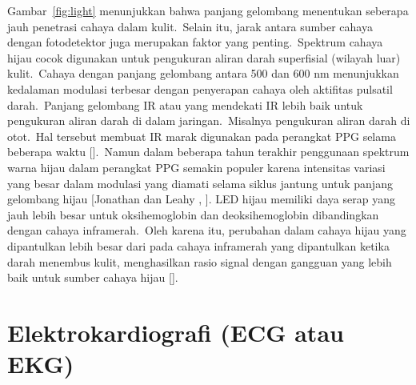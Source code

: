 Gambar~\ref{fig:light} menunjukkan bahwa panjang gelombang menentukan seberapa jauh penetrasi cahaya dalam kulit.~Selain itu, jarak antara sumber cahaya dengan fotodetektor juga merupakan faktor yang penting.~Spektrum cahaya hijau cocok digunakan untuk pengukuran aliran darah superfisial (wilayah luar) kulit.~Cahaya dengan panjang gelombang antara 500 dan 600 nm menunjukkan kedalaman modulasi terbesar dengan penyerapan cahaya oleh aktifitas pulsatil darah.~Panjang gelombang IR atau yang mendekati IR lebih baik untuk pengukuran aliran darah di dalam jaringan.~Misalnya pengukuran aliran darah di otot.~Hal tersebut membuat IR marak digunakan pada perangkat PPG selama beberapa waktu [\citet{Tamura2014}].~Namun dalam beberapa tahun terakhir penggunaan spektrum warna hijau dalam perangkat PPG semakin populer karena intensitas variasi yang besar dalam modulasi yang diamati selama siklus jantung untuk panjang gelombang hijau [Jonathan dan Leahy \citep{Enock}, \citet{Lee2013,Maeda2011,Maeda2008,Matsu2014,Scully2012}].
LED hijau memiliki daya serap yang jauh lebih besar untuk oksihemoglobin dan deoksihemoglobin dibandingkan dengan cahaya inframerah.~Oleh karena itu, perubahan dalam cahaya hijau yang dipantulkan lebih besar dari pada cahaya inframerah yang dipantulkan ketika darah menembus kulit, menghasilkan rasio signal dengan gangguan yang lebih baik untuk sumber cahaya hijau [\citet{Tamura2014}].


\section{Elektrokardiografi (ECG atau EKG)}

